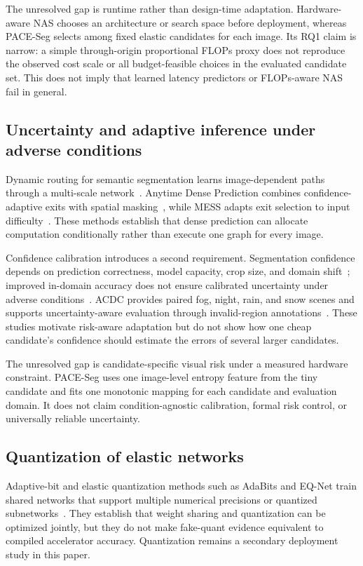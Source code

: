 \documentclass[a4paper,review,12pt]{elsarticle}
\newcommand{\method}{PACE-Seg}
\begin{document}
The unresolved gap is runtime rather than design-time adaptation. Hardware-aware NAS chooses an architecture or search space before deployment, whereas \method{} selects among fixed elastic candidates for each image. Its RQ1 claim is narrow: a simple through-origin proportional FLOPs proxy does not reproduce the observed cost scale or all budget-feasible choices in the evaluated candidate set. This does not imply that learned latency predictors or FLOPs-aware NAS fail in general.

\subsection{Uncertainty and adaptive inference under adverse conditions}

Dynamic routing for semantic segmentation learns image-dependent paths through a multi-scale network~\cite{li2020dynamic}. Anytime Dense Prediction combines confidence-adaptive exits with spatial masking~\cite{liu2022anytime}, while MESS adapts exit selection to input difficulty~\cite{kouris2022mess}. These methods establish that dense prediction can allocate computation conditionally rather than execute one graph for every image.

Confidence calibration introduces a second requirement. Segmentation confidence depends on prediction correctness, model capacity, crop size, and domain shift~\cite{wang2023calibrating}; improved in-domain accuracy does not ensure calibrated uncertainty under adverse conditions~\cite{dejorge2023reliability}. ACDC provides paired fog, night, rain, and snow scenes and supports uncertainty-aware evaluation through invalid-region annotations~\cite{sakaridis2021acdc}. These studies motivate risk-aware adaptation but do not show how one cheap candidate's confidence should estimate the errors of several larger candidates.

The unresolved gap is candidate-specific visual risk under a measured hardware constraint. \method{} uses one image-level entropy feature from the tiny candidate and fits one monotonic mapping for each candidate and evaluation domain. It does not claim condition-agnostic calibration, formal risk control, or universally reliable uncertainty.

\subsection{Quantization of elastic networks}

Adaptive-bit and elastic quantization methods such as AdaBits and EQ-Net train shared networks that support multiple numerical precisions or quantized subnetworks~\cite{jin2020adabits,xu2023eqnet}. They establish that weight sharing and quantization can be optimized jointly, but they do not make fake-quant evidence equivalent to compiled accelerator accuracy. Quantization remains a secondary deployment study in this paper.
\end{document}
